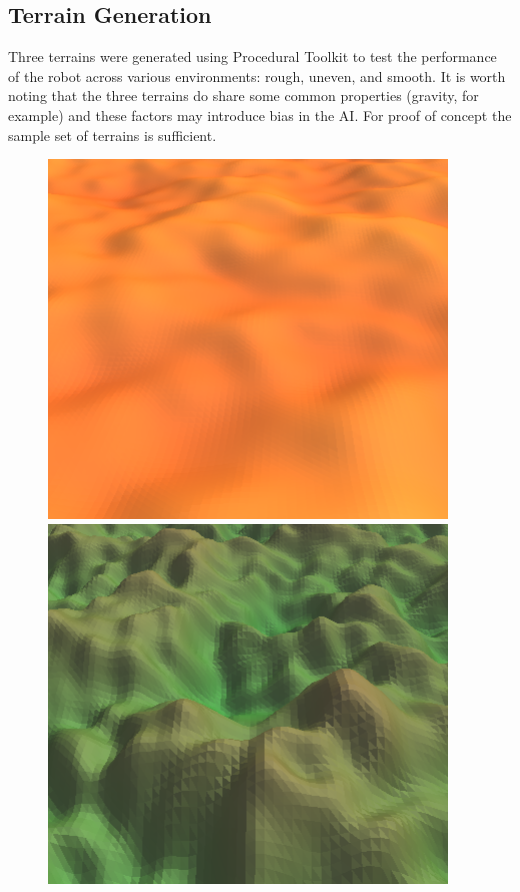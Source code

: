 \documentclass{article}
\begin{document}
\subsection{Terrain Generation}
\label{sec:Terrain Imp}
Three terrains were generated using Procedural Toolkit  to test the performance of the robot across various environments: rough, uneven, and smooth. It is worth noting that the three terrains do share some common properties (gravity, for example) and these factors may introduce bias in the AI. For proof of concept the sample set of terrains is sufficient.\\
\begin{figure}[H]
\centering
\includegraphics[scale=0.3]{smoothTerrain}
\includegraphics[scale=0.3]{unevenTerrain}

\end{figure}
\end{document}
